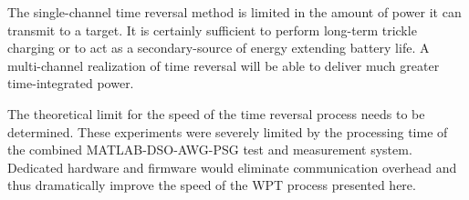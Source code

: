 
The single-channel time reversal method is limited in the amount of power it can
transmit to a target.
%
It is certainly sufficient to perform long-term trickle charging or to act as a
secondary-source of energy extending battery life.
%
A multi-channel realization of time reversal will be able to deliver much
greater time-integrated power.



The theoretical limit for the speed of the time reversal process needs to be
determined.
%
These experiments were severely limited by the processing time of the combined
MATLAB-DSO-AWG-PSG test and measurement system.
%
Dedicated hardware and firmware would eliminate communication overhead and thus
dramatically improve the speed of the WPT process presented here.
